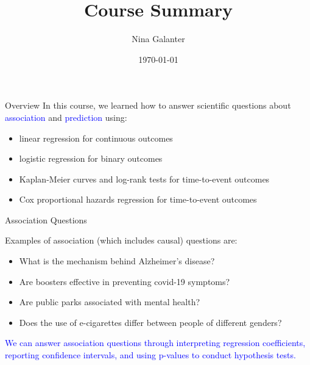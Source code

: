\documentclass[10pt,t]{beamer}
\title{Course Summary}
\author{Nina Galanter}
\date{\today}
\begin{document}
\begin{frame}
	\titlepage 
\end{frame}

\begin{frame}{Overview}
	In this course, we learned how to answer scientific questions about \textcolor{blue}{association} and \textcolor{blue}{prediction} using:
	
	\medskip
	
	\begin{itemize}
		\item linear regression for continuous outcomes
		\medskip
		
		\item logistic regression for binary outcomes
		
		\medskip
		
		\item Kaplan-Meier curves and log-rank tests for time-to-event outcomes
		
		\medskip
		
		\item Cox proportional hazards regression for time-to-event outcomes
	\end{itemize}


\end{frame}

\begin{frame}{Association Questions}

Examples of association (which includes causal) questions are:

\medskip

\begin{itemize}
	\item What is the mechanism behind Alzheimer's disease?
	
	\medskip
	
	\item Are boosters effective in preventing covid-19 symptoms?
	
	\medskip
	
	\item Are public parks associated with mental health?
	
	\medskip
	
	\item Does the use of e-cigarettes differ between people of different genders?
\end{itemize}

\medskip

\textcolor{blue}{We can answer association questions through interpreting regression coefficients, reporting confidence intervals, and using p-values to conduct hypothesis tests.}

	
\end{frame}
\end{document}
